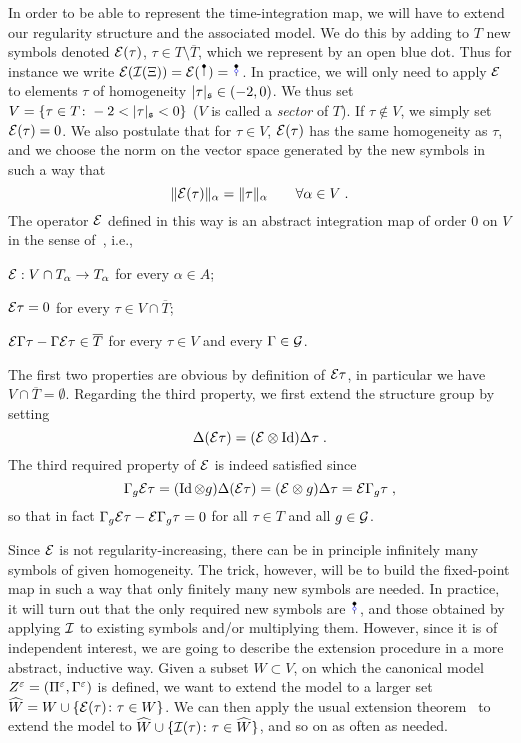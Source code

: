 \documentclass[reqno,11pt]{article}
\DeclareMathOperator{\Id}{Id}
\def\abss#1{\abs{#1}_\mathfrak{s}}
\begin{document}
In order to be able to represent the time-integration map, we will have to
extend our regularity structure and the associated model. We do this by adding
to $T$ new symbols denoted ${\mathcal E}(\tau)$, $\tau\in T\setminus\overline{T}$, which
we represent by an open blue dot. Thus for instance we write $\cE(\cI(\Xi)) =
\cE(\RSI) = \RSoI$. In practice, we will only need to apply ${\mathcal E}$ to elements
$\tau$ of homogeneity $\abss{\tau} \in (-2,0)$. We thus set $V =
\setsuch{\tau\in T}{-2<\abss{\tau}<0}$ ($V$ is called a \emph{sector} of $T$). 
If $\tau\not\in V$, we simply set ${\mathcal E}(\tau)=0$. We also postulate that for
$\tau\in V$, ${\mathcal E}(\tau)$ has the same homogeneity as $\tau$, and we choose the
norm on the vector space generated by the new symbols in such a way that 
\begin{equation}
 \label{eq:E_norm}
 \norm{\cE(\tau)}_\alpha = \norm{\tau}_\alpha
 \qquad 
 \forall \alpha\in V\;.
\end{equation}
The operator ${\mathcal E}$ defined in this way is an abstract integration map of order
$0$ on $V$ in the sense of~\cite[Def.~5.7]{Hairer2014}, i.e.,
\begin{itemizz}
 \item 	${\mathcal E}: V\cap T_\alpha \to T_\alpha$ for every $\alpha\in A$;
 \item 	${\mathcal E}\tau = 0$ for every $\tau \in V\cap\overline{T}$;
 \item 	${\mathcal E}\Gamma\tau - \Gamma{\mathcal E}\tau\in\overline{T}$ for every
$\tau\in V$ and every $\Gamma\in {\mathcal G}$. 
\end{itemizz} 
The first two properties are obvious by definition of ${\mathcal E}\tau$, in particular
we have $V\cap\overline{T} = \emptyset$. Regarding the
third property, we first extend the structure group by setting 
\begin{equation}
 \label{eq:ext05}
 \Delta(\cE\tau) = (\cE\otimes\Id)\Delta\tau\;.
\end{equation} 
The third required property of ${\mathcal E}$ is indeed satisfied since 
\begin{equation}
 \label{eq:GammaE}
 \Gamma_g\cE\tau = (\Id\otimes g)\Delta(\cE\tau) 
 = (\cE\otimes g)\Delta\tau
 = \cE\Gamma_g\tau\;,
\end{equation} 
so that in fact $\Gamma_g{\mathcal E}\tau - {\mathcal E}\Gamma_g\tau = 0$ for all $\tau\in T$ and
all $g\in{\mathcal G}$. 

Since ${\mathcal E}$ is not regularity-increasing, there can be in principle infinitely
many symbols of given homogeneity. The trick, however, will be to build the
fixed-point map in such a way that only finitely many new symbols are needed. 
%
In practice, it will turn out that the only required new symbols are $\RSoI$,
and those obtained by applying ${\mathcal I}$ to existing symbols and/or multiplying
them. However, since it is of independent interest, we are going to describe the
extension procedure in a more abstract, inductive way. Given a subset $W\subset
V$, on which the canonical model $Z^\varepsilon=(\Pi^\varepsilon,\Gamma^\varepsilon)$ is defined, we
want to extend the model to a larger set
$\widehat{W}=W\cup\{{\mathcal E}(\tau)\colon \tau\in W\}$. We can then apply the usual
extension theorem~\cite[Thm~5.14]{Hairer2014} to extend the model to
$\widehat{W}\cup\{{\mathcal I}(\tau)\colon \tau\in \widehat{W}\}$, and so on as often as
needed. 
\end{document}
